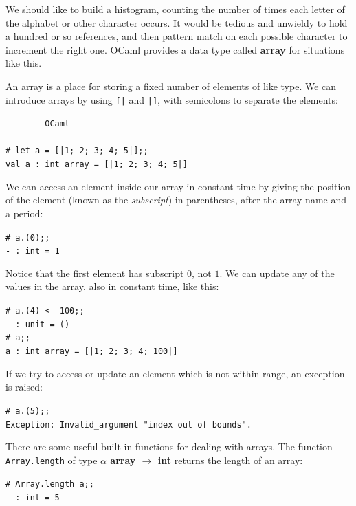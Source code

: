 \documentclass[]{book}
\newcommand{\smspace}{\vspace{4mm}}
\begin{document}
We should like to build a histogram, counting the number of times each letter of the alphabet or other character occurs. It would be tedious and unwieldy to hold a hundred or so references, and then pattern match on each possible character to increment the right one. OCaml provides a data type called \textsf{\textbf{array}} for situations like this.

An array is a place for storing a fixed number of elements of like type. We can introduce arrays by using \texttt{[|} and \texttt{|]}, with semicolons to separate the elements:

\smspace
\noindent\verb!        OCaml!\\
\noindent\\
\noindent\verb!# let a = [|1; 2; 3; 4; 5|];;!\\
\noindent\verb!val a : int array = [|1; 2; 3; 4; 5|]!
\smspace

\noindent We can access an element inside our array in constant time by giving the position of the element (known as the \textit{subscript}) in parentheses, after the array name and a period:

\smspace
\noindent\verb!# a.(0);;!\\
\noindent\verb!- : int = 1!
\smspace

\noindent Notice that the first element has subscript $0$, not $1$. We can update any of the values in the array, also in constant time, like this:

\smspace
\noindent\verb!# a.(4) <- 100;;!\\
\noindent\verb!- : unit = ()!\\
\noindent\verb!# a;;!\\
\noindent\verb!a : int array = [|1; 2; 3; 4; 100|]!
\smspace

\noindent If we try to access or update an element which is not within range, an exception is raised:

\smspace
\noindent\verb!# a.(5);;!\\
\noindent\verb!Exception: Invalid_argument "index out of bounds".!
\smspace

\noindent There are some useful built-in functions for dealing with arrays. The function \texttt{Array.length} of type \textbf{\textsf{$\alpha$ array $\rightarrow$ int}} returns the length of an array:

\smspace
\noindent\verb!# Array.length a;;!\\
\noindent\verb!- : int = 5!
\smspace
\end{document}
